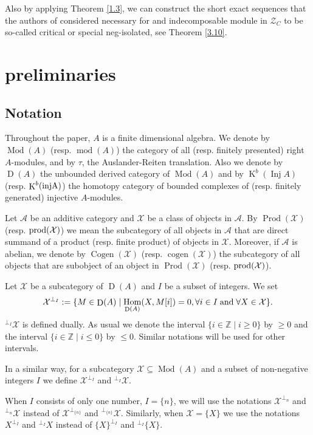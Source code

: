 \documentclass[12pt]{amsart}
\numberwithin{equation}{section}
\theoremstyle{definition}
\DeclareMathOperator{\Mod}{Mod}
\DeclareMathOperator{\modd}{mod}
\DeclareMathOperator{\Hom}{Hom}
\DeclareMathOperator{\K}{K}
\DeclareMathOperator{\Cogen}{Cogen}
\DeclareMathOperator{\cogen}{cogen}
\DeclareMathOperator{\Inj}{Inj}
\DeclareMathOperator{\D}{D}
\DeclareMathOperator{\Prod}{Prod}
\newtheorem*{theorem 0*}{Theorem}
\newtheorem*{theorem a*}{Theorem A}
\newtheorem*{theorem b*}{Theorem B}
\numberwithin{diagram}{section}
\begin{document}
Also by applying Theorem \ref{1.3}, we can construct the short exact sequences that the authors of \cite{AHL} considered necessary for and indecomposable module in $\mathcal{Z}_C$ to be so-called critical or special neg-isolated, see Theorem \ref{3.10}.
	
	\section{preliminaries}
	\subsection{Notation}
Throughout the paper, $A$ is a finite dimensional algebra. We denote by $\Mod(A)$ (resp. $\modd(A)$) the category of all (resp. finitely presented) right $A$-modules, and by $\tau$, the Auslander-Reiten translation. Also we denote by $\D(A)$ the unbounded derived category of $\Mod(A)$ and by $\K^b(\Inj A)$ (resp. $\K^b(\rm inj A)$) the homotopy category of bounded complexes of (resp. finitely generated) injective $A$-modules.
	
Let $\mathcal{A}$ be an additive category and $\mathcal{X}$ be a class of objects in $\mathcal{A}$. By $\Prod(\mathcal{X})$ (resp. $\rm prod(\mathcal{X})$) we mean the subcategory of all objects in $\mathcal{A}$ that are direct summand of a product (resp. finite product) of objects in $\mathcal{X}$. Moreover, if $\mathcal{A}$ is abelian, we denote by $\Cogen(\mathcal{X})$ (resp. $\cogen(\mathcal{X})$) the subcategory of all objects that are subobject of an object in $\Prod(\mathcal{X})$ (resp. $\rm prod(\mathcal{X})$).
	
	Let $\mathcal{X}$ be a subcategory of $\D(A)$ and $I$ be a subset of integers. We set
	\begin{equation}
		\mathcal{X}^{\bot_I}:=\{M\in \D(A) \mid \Hom_{\D(A)}(X,M[i])=0, \forall i\in I \;\text{and}\; \forall X\in \mathcal{X}\}.\notag
	\end{equation}
${}^{\bot_I}\mathcal{X}$ is defined dually. As usual we denote the interval $\{i\in \mathbb{Z}\mid i\geq 0 \}$ by $\geq 0$ and the interval $\{i\in \mathbb{Z}\mid i\leq 0 \}$ by $\leq 0$. Similar notations will be used for other intervals.
	
In a similar way, for a subcategory $\mathcal{X}\subseteq \Mod(A)$ and a subset of non-negative integers $I$ we define $\mathcal{X}^{\bot_I}$ and $^{\bot_I}\mathcal{X}$.
    
When $I$ consists of only one number, $I=\{n\}$, we will use the notations $\mathcal{X}^{\bot_n}$ and ${}^{\bot_n}\mathcal{X}$ instead of $\mathcal{X}^{\bot_{\{n\}}}$ and ${}^{\bot_{\{n\}}}\mathcal{X}$. Similarly, when $\mathcal{X}=\{X\}$ we use the notations $X^{\bot_I}$ and ${}^{\bot_I}X$ instead of $\{X\}^{\bot_I}$ and $^{\bot_I}\{X\}$.
	
\end{document}
